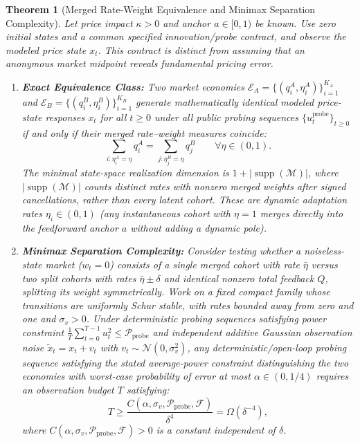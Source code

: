 \documentclass[12pt]{article}
\newtheorem{theorem}{Theorem}[section]
\theoremstyle{definition}
\theoremstyle{remark}
\begin{document}
\begin{theorem}[Merged Rate-Weight Equivalence and Minimax Separation Complexity]
\label{thm:m1_equivalence}\label{thm:m2_sample_complexity}
Let price impact $\kappa > 0$ and anchor $a \in [0, 1)$ be known. Use zero initial states and a common specified innovation/probe contract, and observe the modeled price state $x_t$. This contract is distinct from assuming that an anonymous market midpoint reveals fundamental pricing error.
\begin{enumerate}
    \item \textbf{Exact Equivalence Class:} Two market economies $\mathcal{E}_A = \{(q_i^A, \eta_i^A)\}_{i=1}^{K_A}$ and $\mathcal{E}_B = \{(q_i^B, \eta_i^B)\}_{i=1}^{K_B}$ generate mathematically identical modeled price-state responses $x_t$ for all $t \ge 0$ under all public probing sequences $\{u_t^{\text{probe}}\}_{t \ge 0}$ if and only if their merged rate--weight measures coincide:
    \begin{equation}
    \sum_{i: \eta_i^A = \eta} q_i^A = \sum_{j: \eta_j^B = \eta} q_j^B \qquad \forall \eta \in (0, 1).
    \label{eq:merged_measure}
    \end{equation}
    The minimal state-space realization dimension is $1 + |\operatorname{supp}(\mathcal{M})|$, where $|\operatorname{supp}(\mathcal{M})|$ counts distinct rates with nonzero merged weights after signed cancellations, rather than every latent cohort. These are dynamic adaptation rates $\eta_i \in (0, 1)$ (any instantaneous cohort with $\eta = 1$ merges directly into the feedforward anchor $a$ without adding a dynamic pole).
    \item \textbf{Minimax Separation Complexity:} Consider testing whether a noiseless-state market ($w_t = 0$) consists of a single merged cohort with rate $\bar{\eta}$ versus two split cohorts with rates $\bar{\eta} \pm \delta$ and identical nonzero total feedback $Q$, splitting its weight symmetrically. Work on a fixed compact family whose transitions are uniformly Schur stable, with rates bounded away from zero and one and $\sigma_v>0$. Under deterministic probing sequences satisfying power constraint $\frac{1}{T} \sum_{t=0}^{T-1} u_t^2 \le \mathcal{P}_{\text{probe}}$ and independent additive Gaussian observation noise $\tilde{x}_t = x_t + v_t$ with $v_t \sim \mathcal{N}(0, \sigma_v^2)$, any deterministic/open-loop probing sequence satisfying the stated average-power constraint distinguishing the two economies with worst-case probability of error at most $\alpha \in (0, 1/4)$ requires an observation budget $T$ satisfying:
    \begin{equation}
    T \ge \frac{C(\alpha, \sigma_v, \mathcal{P}_{\text{probe}},\mathcal F)}{\delta^4} = \Omega(\delta^{-4}),
    \label{eq:delta_fourth}
    \end{equation}
    where $C(\alpha, \sigma_v, \mathcal{P}_{\text{probe}},\mathcal F) > 0$ is a constant independent of $\delta$.
\end{enumerate}
\end{theorem}
\end{document}
